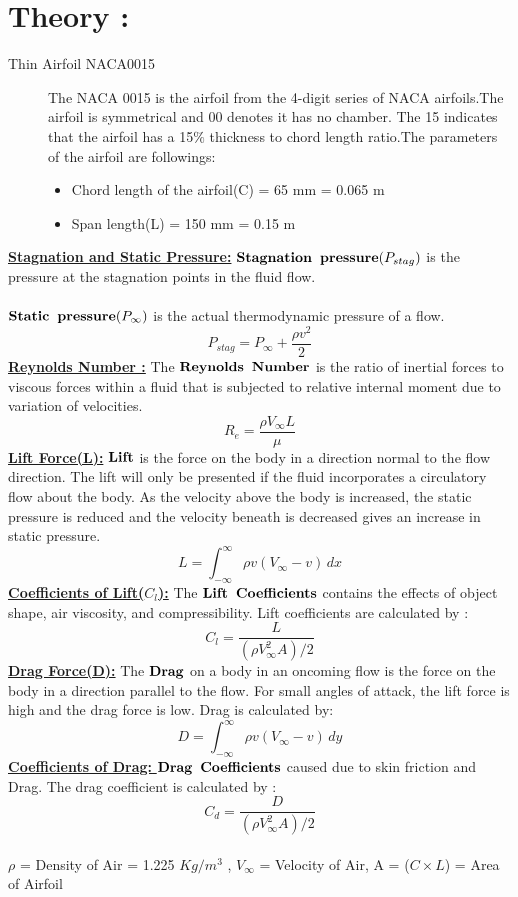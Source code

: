 \documentclass[12pt,a4paper]{article}
\begin{document}
\section{Theory :}
\begin{description}
   \item[Thin Airfoil NACA0015] The NACA 0015 is the airfoil from the 4-digit series of NACA airfoils.The airfoil is symmetrical and 00 denotes it has no chamber. The 15 indicates that the airfoil 
has a 15$\%$ thickness to chord length ratio.The parameters of the airfoil are followings:
\begin{itemize}
    \item Chord length of the airfoil(C) = 65 mm = 0.065 m
    \item Span length(L) = 150 mm = 0.15 m
\end{itemize}
\end{description}
\underline{\textbf{Stagnation and Static Pressure:}}
$\bold{Stagnation \hspace{2 mm} pressure}(P_{stag})$ is the pressure at the stagnation points in the fluid flow.\\
\\$\bold{Static \hspace{2mm} pressure}(P_{\infty})$ is the actual thermodynamic pressure of a flow.
$$  P_{stag} = P_{\infty} + \frac{\rho v^2}{2} $$
\underline{\textbf{Reynolds Number :}}
The $\bold{Reynolds \hspace{2mm} Number}$ is the ratio of inertial forces to viscous forces within a fluid that is subjected to relative internal moment due to variation of velocities.
$$  R_e = \frac{\rho V_{\infty} L}{\mu} $$
\underline{\textbf{Lift Force(L):}} $\bold{Lift}$ is the force on the body in a direction normal to the flow direction. The lift will only be 
presented if the fluid incorporates a circulatory flow about the body. As the velocity above the body is increased, the static pressure is reduced and the velocity beneath is 
decreased gives an increase in static pressure.\\
$$L = \int_{-\infty}^{\infty} \rho v (V_{\infty}-v)\,dx $$
\vspace{5mm}
\underline{\textbf{Coefficients of Lift($C_l$):}} The $\bold{Lift \hspace{2 mm} Coefficients}$ contains the effects of object shape, air viscosity, and compressibility. Lift coefficients are calculated by :  
$$ C_l = \frac{L}{(\rho V_{\infty}^2 A)/2} $$
\underline{\textbf{Drag Force(D):}} The $\bold{Drag}$ on  a  body in  an  oncoming flow  is the force on  the  body in  a  direction parallel to the flow. For small angles of attack, the lift force is high and the drag force is low.
Drag is calculated by: \\
$$D = \int_{-\infty}^{\infty} \rho v (V_{\infty}-v)\,dy $$
\underline{\textbf{Coefficients of Drag: }}  $\bold{Drag \hspace{2mm} Coefficients}$ caused due to skin friction and Drag. The drag coefficient is calculated by :
$$ C_d = \frac{D}{(\rho V_{\infty}^2 A)/2} $$ \\
$\rho$ = Density of Air = 1.225 $Kg/m^3$ , $V_{\infty}$ = Velocity of Air, A = ($C\times L$) = Area of Airfoil
\end{document}
